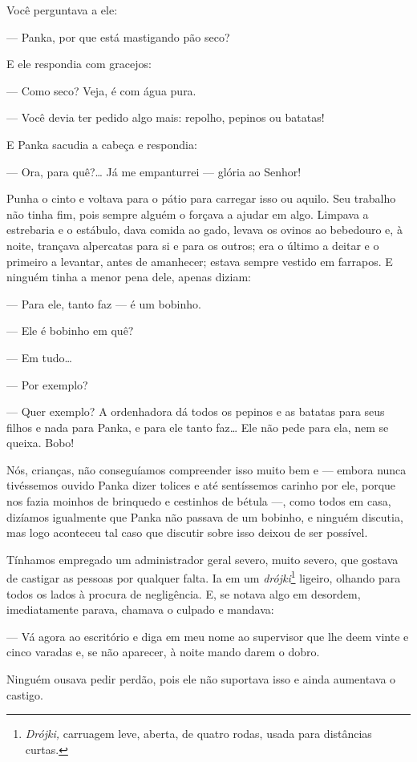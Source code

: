 Você perguntava a ele:

--- Panka, por que está mastigando pão seco?

E ele respondia com gracejos:

--- Como seco? Veja, é com água pura.

--- Você devia ter pedido algo mais: repolho, pepinos ou batatas!

E Panka sacudia a cabeça e respondia:

--- Ora, para quê?\ldots{} Já me empanturrei --- glória ao Senhor!

Punha o cinto e voltava para o pátio para carregar isso ou aquilo. Seu
trabalho não tinha fim, pois sempre alguém o forçava a ajudar em algo.
Limpava a estrebaria e o estábulo, dava comida ao gado, levava os ovinos
ao bebedouro e, à noite, trançava alpercatas para si e para os outros;
era o último a deitar e o primeiro a levantar, antes de amanhecer;
estava sempre vestido em farrapos. E ninguém tinha a menor pena dele, apenas
diziam:

--- Para ele, tanto faz --- é um bobinho.

--- Ele é bobinho em quê?

--- Em tudo\ldots{}

--- Por exemplo?

--- Quer exemplo? A ordenhadora dá todos os pepinos e as batatas para
seus filhos e nada para Panka, e para ele tanto faz\ldots{} Ele não pede para
ela, nem se queixa. Bobo!

Nós, crianças, não conseguíamos compreender isso muito bem e --- embora
nunca tivéssemos ouvido Panka dizer tolices e até sentíssemos carinho
por ele, porque nos fazia moinhos de brinquedo e cestinhos de bétula ---, como todos em casa, dizíamos igualmente que Panka não passava de
um bobinho, e ninguém discutia, mas logo aconteceu tal caso que discutir
sobre isso deixou de ser possível.

Tínhamos empregado um administrador geral severo, muito severo, que
gostava de castigar as pessoas por qualquer falta. Ia em um
\emph{drójki}\footnote{\emph{Drójki,} carruagem leve, aberta, de
  quatro rodas, usada para distâncias curtas.} ligeiro, olhando para
todos os lados à procura de negligência. E, se notava algo em desordem,
imediatamente parava, chamava o culpado e mandava:

--- Vá agora ao escritório e diga em meu nome ao supervisor que lhe deem
vinte e cinco varadas e, se não aparecer, à noite mando darem o dobro.

Ninguém ousava pedir perdão, pois ele não suportava isso e ainda
aumentava o castigo.

